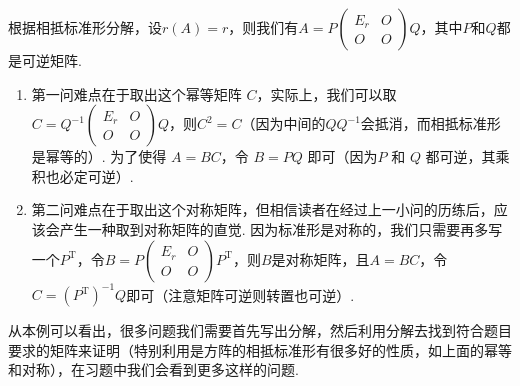 \begin{solution}
    根据相抵标准形分解，设$r(A)=r$，则我们有$A=P\begin{pmatrix}
            E_r & O \\ O & O
        \end{pmatrix}Q$，其中$P$和$Q$都是可逆矩阵.
    \begin{enumerate}
        \item 第一问难点在于取出这个幂等矩阵 $C$，实际上，我们可以取$C=Q^{-1}\begin{pmatrix}
                      E_r & O \\ O & O
                  \end{pmatrix}Q$，则$C^2=C$（因为中间的$QQ^{-1}$会抵消，而相抵标准形是幂等的）. 为了使得 $A = BC$，令 $B = PQ$ 即可（因为$P$ 和 $Q$ 都可逆，其乘积也必定可逆）.

        \item 第二问难点在于取出这个对称矩阵，但相信读者在经过上一小问的历练后，应该会产生一种取到对称矩阵的直觉. 因为标准形是对称的，我们只需要再多写一个$P^\mathrm{T}$，令$B=P\begin{pmatrix}
                      E_r & O \\ O & O
                  \end{pmatrix}P^\mathrm{T}$，则$B$是对称矩阵，且$A=BC$，令$C=(P^\mathrm{T})^{-1}Q$即可（注意矩阵可逆则转置也可逆）.
    \end{enumerate}
\end{solution}

从本例可以看出，很多问题我们需要首先写出分解，然后利用分解去找到符合题目要求的矩阵来证明（特别利用是方阵的相抵标准形有很多好的性质，如上面的幂等和对称），在习题中我们会看到更多这样的问题.

